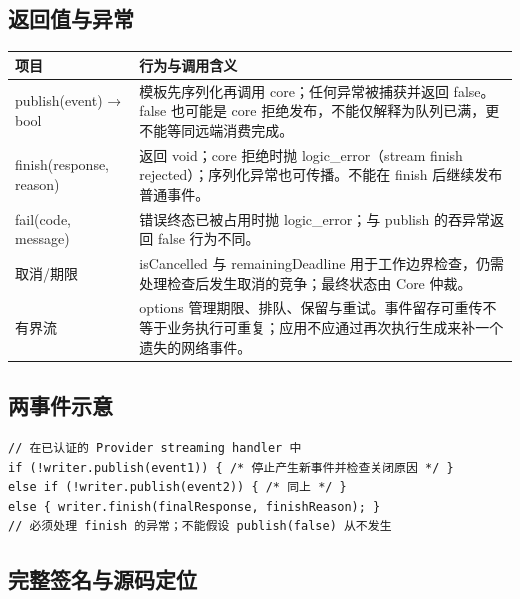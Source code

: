 \subsection{返回值与异常}

\begin{longtable}{@{}p{43mm}p{119mm}@{}}
\toprule
项目 & 行为与调用含义 \\
\midrule\endhead
publish(event) → bool & 模板先序列化再调用 core；任何异常被捕获并返回 false。false 也可能是 core 拒绝发布，不能仅解释为队列已满，更不能等同远端消费完成。 \\
finish(response, reason) & 返回 void；core 拒绝时抛 logic\_error（stream finish rejected）；序列化异常也可传播。不能在 finish 后继续发布普通事件。 \\
fail(code, message) & 错误终态已被占用时抛 logic\_error；与 publish 的吞异常返回 false 行为不同。 \\
取消/期限 & isCancelled 与 remainingDeadline 用于工作边界检查，仍需处理检查后发生取消的竞争；最终状态由 Core 仲裁。 \\
有界流 & options 管理期限、排队、保留与重试。事件留存可重传不等于业务执行可重复；应用不应通过再次执行生成来补一个遗失的网络事件。 \\
\bottomrule
\end{longtable}

\subsection{两事件示意}

\begin{Verbatim}[fontsize=\footnotesize,breaklines,breakanywhere]
// 在已认证的 Provider streaming handler 中
if (!writer.publish(event1)) { /* 停止产生新事件并检查关闭原因 */ }
else if (!writer.publish(event2)) { /* 同上 */ }
else { writer.finish(finalResponse, finishReason); }
// 必须处理 finish 的异常；不能假设 publish(false) 从不发生
\end{Verbatim}

\subsection{完整签名与源码定位}

